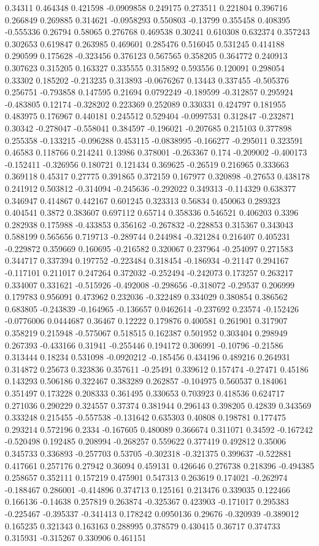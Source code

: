 0.34311 0.464348 0.421598 -0.0909858 0.249175 0.273511 0.221804 0.396716 0.266849 0.269885 0.314621 -0.0958293 0.550803 -0.13799 0.355458 0.408395 -0.555336 0.26794 0.58065 0.276768 0.469538 0.30241 0.610308 0.632374 0.357243 0.302653 0.619847 0.263985 0.469601 0.285476 0.516045 0.531245 0.414188 0.290599 0.175628 -0.323456 0.376123 0.567565 0.358205 0.364772 0.240913 0.307623 0.315205 0.163327 0.335555 0.315892 0.593556 0.120091 0.298054 0.33302 0.185202 -0.213235 0.313893 -0.0676267 0.13443 0.337455 -0.505376 0.256751 -0.793858 0.147595 0.21694 0.0792249 -0.189599 -0.312857 0.295924 -0.483805 0.12174 -0.328202 0.223369 0.252089 0.330331 0.424797 0.181955 0.483975 0.176967 0.440181 0.245512 0.529404 -0.0997531 0.312847 -0.232871 0.30342 -0.278047 -0.558041 0.384597 -0.196021 -0.207685 0.215103 0.377898 0.255358 -0.133215 -0.096288 0.453115 -0.0838995 -0.166277 -0.295011 0.323591 0.46583 0.118766 0.214241 0.13986 0.378001 -0.263367 0.174 -0.209002 -0.400173 -0.152411 -0.326956 0.180721 0.121434 0.369625 -0.26519 0.216965 0.333663 0.369118 0.45317 0.27775 0.391865 0.372159 0.167977 0.320898 -0.27653 0.438178 0.241912 0.503812 -0.314094 -0.245636 -0.292022 0.349313 -0.114329 0.638377 0.346947 0.414867 0.442167 0.601245 0.323313 0.56834 0.450063 0.289323 0.404541 0.3872 0.383607 0.697112 0.65714 0.358336 0.546521 0.406203 0.3396 0.282938 0.175988 -0.433853 0.356162 -0.267832 -0.228853 0.315367 0.343043 0.588199 0.565656 0.719713 -0.289744 0.244984 -0.321284 0.216407 0.405231 -0.229872 0.359669 0.160695 -0.216582 0.320067 0.237964 -0.254097 0.271583 0.344717 0.337394 0.197752 -0.223484 0.318454 -0.186934 -0.21147 0.294167 -0.117101 0.211017 0.247264 0.372032 -0.252494 -0.242073 0.173257 0.263217 0.334007 0.331621 -0.515926 -0.492008 -0.298656 -0.318072 -0.29537 0.206999 0.179783 0.956091 0.473962 0.232036 -0.322489 0.334029 0.380854 0.386562 0.683805 -0.243839 -0.164965 -0.136657 0.0462614 -0.237692 0.23574 -0.152426 -0.0776006 0.0444687 0.36467 0.12222 0.179876 0.400581 0.261901 0.317907 0.358219 0.215948 -0.575067 0.518515 0.162387 0.501952 0.303404 0.298949 0.267393 -0.433166 0.31941 -0.255446 0.194172 0.306991 -0.10796 -0.21586 0.313444 0.18234 0.531098 -0.0920212 -0.185456 0.434196 0.489216 0.264931 0.314872 0.25673 0.323836 0.357611 -0.25491 0.339612 0.157474 -0.27471 0.45186 0.143293 0.506186 0.322467 0.383289 0.262857 -0.104975 0.560537 0.184061 0.351497 0.173228 0.208333 0.361495 0.330653 0.703923 0.418536 0.624717 0.271036 0.290229 0.324557 0.37374 0.381944 0.296143 0.398205 0.42839 0.343569 0.333248 0.215455 -0.557538 -0.131642 0.635303 0.40808 0.198781 0.177475 0.293214 0.572196 0.2334 -0.167605 0.480089 0.366674 0.311071 0.34592 -0.167242 -0.520498 0.192485 0.208994 -0.268257 0.559622 0.377419 0.492812 0.35006 0.345733 0.336893 -0.257703 0.53705 -0.302318 -0.321375 0.399637 -0.522881 0.417661 0.257176 0.27942 0.36094 0.459131 0.426646 0.276738 0.218396 -0.494385 0.258657 0.352111 0.157219 0.475901 0.547313 0.263619 0.174021 -0.262974 -0.188467 0.286001 -0.414896 0.374713 0.125161 0.213476 0.339035 0.122466 0.166136 -0.14638 0.257819 0.263874 -0.325367 0.423903 -0.171017 0.295383 -0.225467 -0.395337 -0.341413 0.178242 0.0950136 0.29676 -0.320939 -0.389012 0.165235 0.321343 0.163163 0.288995 0.378579 0.430415 0.36717 0.374733 0.315931 -0.315267 0.330906 0.461151 